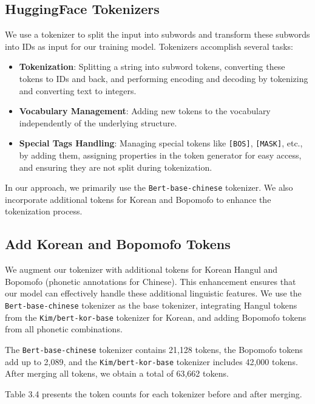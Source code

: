 \documentclass[PhD]{PHlab-thesis}
\begin{document}
\subsection{HuggingFace Tokenizers}
We use a tokenizer to split the input into subwords and transform these subwords into IDs as input for our training model. Tokenizers accomplish several tasks:

\begin{itemize}
    \item \textbf{Tokenization}: Splitting a string into subword tokens, converting these tokens to IDs and back, and performing encoding and decoding by tokenizing and converting text to integers.
    \item \textbf{Vocabulary Management}: Adding new tokens to the vocabulary independently of the underlying structure.
    \item \textbf{Special Tags Handling}: Managing special tokens like \texttt{[BOS]}, \texttt{[MASK]}, etc., by adding them, assigning properties in the token generator for easy access, and ensuring they are not split during tokenization.
\end{itemize}

In our approach, we primarily use the \texttt{Bert-base-chinese} tokenizer. We also incorporate additional tokens for Korean and Bopomofo to enhance the tokenization process.


\subsection{Add Korean and Bopomofo Tokens}
We augment our tokenizer with additional tokens for Korean Hangul and Bopomofo (phonetic annotations for Chinese). This enhancement ensures that our model can effectively handle these additional linguistic features. We use the \texttt{Bert-base-chinese} tokenizer as the base tokenizer, integrating Hangul tokens from the \texttt{Kim/bert-kor-base} tokenizer for Korean, and adding Bopomofo tokens from all phonetic combinations.

The \texttt{Bert-base-chinese} tokenizer contains 21,128 tokens, the Bopomofo tokens add up to 2,089, and the \texttt{Kim/bert-kor-base} tokenizer includes 42,000 tokens. After merging all tokens, we obtain a total of 63,662 tokens. 

Table 3.4 presents the token counts for each tokenizer before and after merging.

\end{document}
